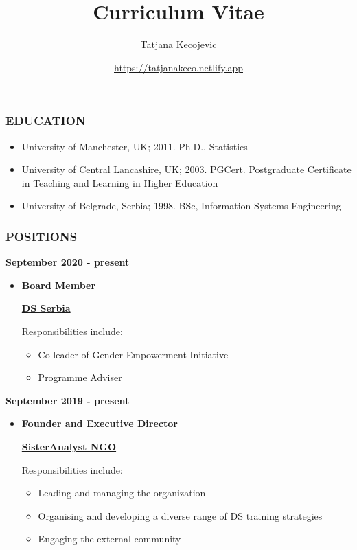 \documentclass[
]{article}
\title{Curriculum Vitae}
\author{Tatjana Kecojevic}
\date{\url{https://tatjanakeco.netlify.app}}
\providecommand{\tightlist}{%
  \setlength{\itemsep}{0pt}\setlength{\parskip}{0pt}}
\begin{document}
\maketitle

\hypertarget{education}{%
\subsubsection{EDUCATION}\label{education}}

\begin{itemize}
\tightlist
\item
  University of Manchester, UK; 2011. Ph.D., Statistics
\item
  University of Central Lancashire, UK; 2003. PGCert. Postgraduate
  Certificate in Teaching and Learning in Higher Education
\item
  University of Belgrade, Serbia; 1998. BSc, Information Systems
  Engineering
\end{itemize}

\hypertarget{positions}{%
\subsubsection{POSITIONS}\label{positions}}

\textbf{September 2020 - present}

\begin{itemize}
\item
  \textbf{Board Member}

  \href{https://datasciconference.com/}{\textbf{DS Serbia}}

  Responsibilities include:

  \begin{itemize}
  \tightlist
  \item
    Co-leader of Gender Empowerment Initiative
  \item
    Programme Adviser
  \end{itemize}
\end{itemize}

\textbf{September 2019 - present}

\begin{itemize}
\item
  \textbf{Founder and Executive Director}

  \href{https://sisteranalyst.org}{\textbf{SisterAnalyst NGO}}

  Responsibilities include:

  \begin{itemize}
  \tightlist
  \item
    Leading and managing the organization
  \item
    Organising and developing a diverse range of DS training strategies
  \item
    Engaging the external community
  \end{itemize}
\end{itemize}
\end{document}
